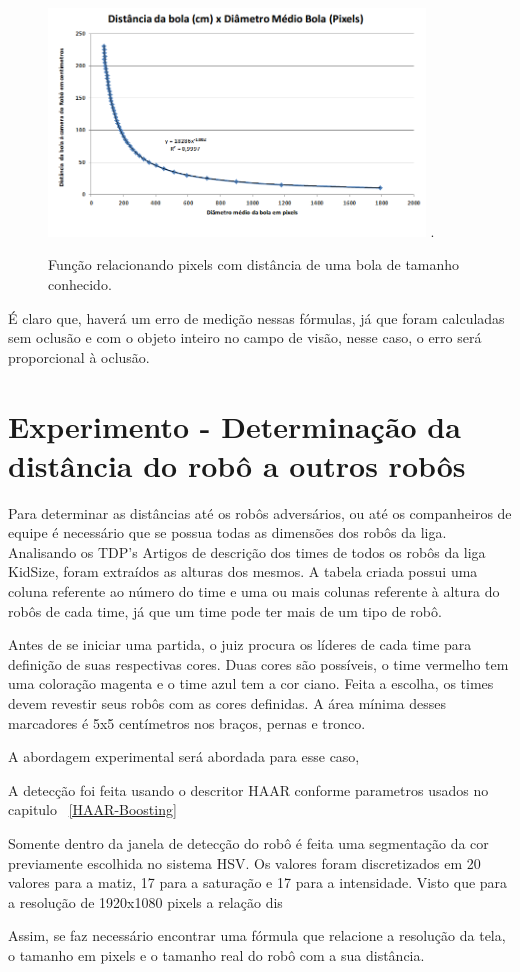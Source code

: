 \begin{figure}[!t1]
\centering
\includegraphics[width=10cm]{Imagens/Dist.png}
\DeclareGraphicsExtensions.
\caption{Função relacionando pixels com distância de uma bola de tamanho conhecido.}
\label{Fig:DistBall}
\end{figure}

É claro que, haverá um erro de medição nessas fórmulas, já que foram calculadas sem oclusão e com o objeto inteiro no campo de visão, nesse caso, o erro será proporcional à oclusão.


\section{Experimento - Determinação da distância do robô a outros robôs}

Para determinar as distâncias até os robôs adversários, ou até os companheiros de equipe é necessário que se possua todas as dimensões dos robôs da liga. Analisando os TDP's Artigos de descrição dos times de todos os robôs da liga KidSize, foram extraídos as alturas dos mesmos.
A tabela criada possui uma coluna referente ao número do time e uma ou mais colunas referente à altura do robôs de cada time, já que um time pode ter mais de um tipo de robô. 

Antes de se iniciar uma partida, o juiz procura os líderes de cada time para definição de suas respectivas cores. Duas cores são possíveis, o time vermelho tem uma coloração magenta e o time azul tem a cor ciano. Feita a escolha, os times devem revestir seus robôs com as cores definidas. A área mínima desses marcadores é 5x5 centímetros nos braços, pernas e tronco.

A abordagem experimental será abordada para esse caso, 

A detecção foi feita usando o descritor HAAR conforme parametros usados no capitulo ~\ref{HAAR-Boosting}

Somente dentro da janela de detecção do robô é feita uma segmentação da cor previamente escolhida no sistema HSV. Os valores foram discretizados em 20 valores para a matiz, 17 para a saturação e 17 para a intensidade.
Visto que para a resolução de 1920x1080 pixels a relação dis

Assim, se faz necessário encontrar uma fórmula que relacione a resolução da tela, o tamanho em pixels e o tamanho real do robô com a sua distância.

\pagebreak
